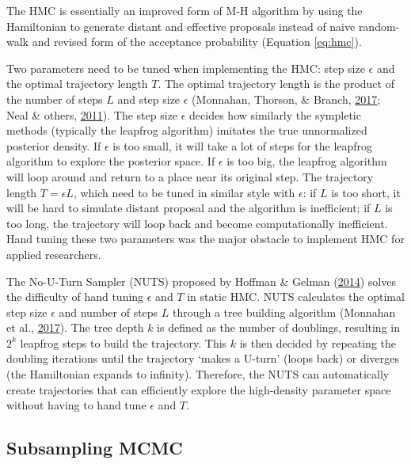 \documentclass[12pt]{book}
\numberwithin{equation}{chapter}
\begin{document}
The HMC is essentially an improved form of M-H algorithm by using the Hamiltonian to generate distant and effective proposals instead of naive random-walk and revised form of the acceptance probability (Equation \eqref{eq:hmc}).

Two parameters need to be tuned when implementing the HMC: step size \(\epsilon\) and the optimal trajectory length \(T\). The optimal trajectory length is the product of the number of steps \(L\) and step size \(\epsilon\) (Monnahan, Thorson, \& Branch, \protect\hyperlink{ref-monnahan2017faster}{2017}; Neal \& others, \protect\hyperlink{ref-neal2011mcmc}{2011}). The step size \(\epsilon\) decides how similarly the sympletic methods (typically the leapfrog algorithm) imitates the true unnormalized posterior density. If \(\epsilon\) is too small, it will take a lot of steps for the leapfrog algorithm to explore the posterior space. If \(\epsilon\) is too big, the leapfrog algorithm will loop around and return to a place near its original step. The trajectory length \(T = \epsilon L\), which need to be tuned in similar style with \(\epsilon\): if \(L\) is too short, it will be hard to simulate distant proposal and the algorithm is inefficient; if \(L\) is too long, the trajectory will loop back and become computationally inefficient. Hand tuning these two parameters was the major obstacle to implement HMC for applied researchers.

The No-U-Turn Sampler (NUTS) proposed by Hoffman \& Gelman (\protect\hyperlink{ref-hoffman2014no}{2014}) solves the difficulty of hand tuning \(\epsilon\) and \(T\) in static HMC. NUTS calculates the optimal step size \(\epsilon\) and number of steps \(L\) through a tree building algorithm (Monnahan et al., \protect\hyperlink{ref-monnahan2017faster}{2017}). The tree depth \(k\) is defined as the number of doublings, resulting in \(2^k\) leapfrog steps to build the trajectory. This \(k\) is then decided by repeating the doubling iterations until the trajectory `makes a U-turn' (loops back) or diverges (the Hamiltonian expands to infinity). Therefore, the NUTS can automatically create trajectories that can efficiently explore the high-density parameter space without having to hand tune \(\epsilon\) and \(T\).

\hypertarget{subsampling-mcmc}{%
\subsection{Subsampling MCMC}\label{subsampling-mcmc}}
\end{document}
